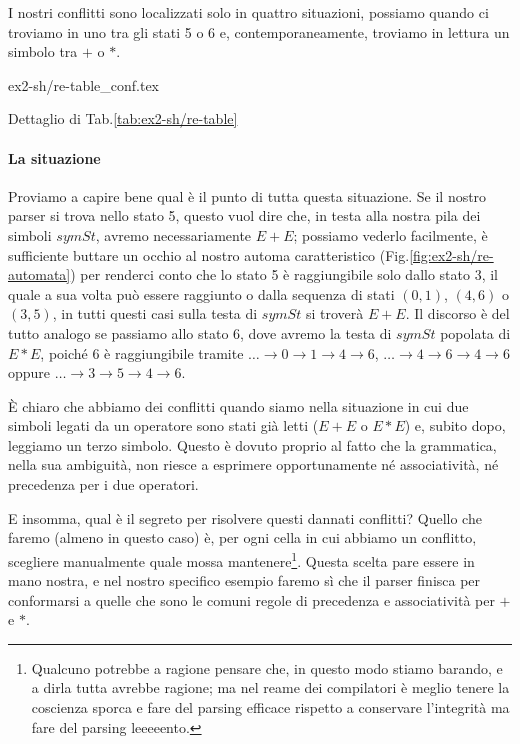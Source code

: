 \documentclass[class=book, crop=false, oneside, 12pt]{standalone}
\begin{document}
I nostri conflitti sono localizzati solo in quattro situazioni, possiamo quando ci troviamo in uno tra gli stati 5 o 6 e, contemporaneamente, troviamo in lettura un simbolo tra \(+\) o \(\ast\).

\begin{table}[H]
    \centering
    {ex2-sh/re-table_conf.tex}
    \caption{Dettaglio di Tab.\ref{tab:ex2-sh/re-table}}
    \label{tab:ex2-sh/re-table_conf}
\end{table}

\paragraph{La situazione}
Proviamo a capire bene qual è il punto di tutta questa situazione. Se il nostro parser si trova nello stato 5, questo vuol dire che, in testa alla nostra pila dei simboli \(symSt\), avremo necessariamente \(E + E\); possiamo vederlo facilmente, è sufficiente buttare un occhio al nostro automa caratteristico (Fig.\ref{fig:ex2-sh/re-automata}) per renderci conto che lo stato 5 è raggiungibile solo dallo stato \(3\), il quale a sua volta può essere raggiunto o dalla sequenza di stati \((0, 1)\), \((4, 6)\) o \((3, 5)\), in tutti questi casi sulla testa di \(symSt\) si troverà \(E + E\). Il discorso è del tutto analogo se passiamo allo stato 6, dove avremo la testa di \(symSt\) popolata di \(E * E\), poiché 6 è raggiungibile tramite \(\dots \to 0 \to 1 \to 4 \to 6\), \(\dots \to 4 \to 6 \to 4 \to 6\) oppure \(\dots \to 3 \to 5 \to 4 \to 6\).

È chiaro che abbiamo dei conflitti quando siamo nella situazione in cui due simboli legati da un operatore sono stati già letti (\(E + E\) o \(E * E\)) e, subito dopo, leggiamo un terzo simbolo. Questo è dovuto proprio al fatto che la grammatica, nella sua ambiguità, non riesce a esprimere opportunamente né associatività, né precedenza per i due operatori.

E insomma, qual è il segreto per risolvere questi dannati conflitti? Quello che faremo (almeno in questo caso) è, per ogni cella in cui abbiamo un conflitto, scegliere manualmente quale mossa mantenere\footnote{Qualcuno potrebbe a ragione pensare che, in questo modo stiamo barando, e a dirla tutta avrebbe ragione; ma nel reame dei compilatori è meglio tenere la coscienza sporca e fare del parsing efficace  rispetto a conservare l'integrità ma fare del parsing leeeeento.}. Questa scelta pare essere in mano nostra, e nel nostro specifico esempio faremo sì che il parser finisca per conformarsi a quelle che sono le comuni regole di precedenza e associatività per \(+\) e \(*\). 
\end{document}
